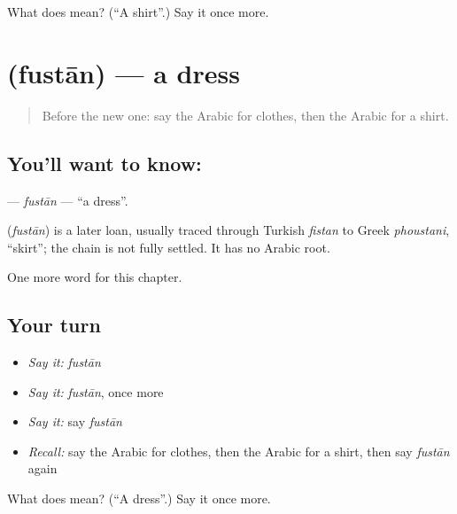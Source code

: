 \begin{tcolorbox}[breakable,colback=teal!4,colframe=teal!35!black,title={Before you move on}]
What does  mean? (\textquotedblleft{}A shirt\textquotedblright{}.) Say it once more.
\end{tcolorbox}
\section[\texorpdfstring{\ar{فستان} (fustān)}{فستان (fustān)}]{ (fustān) — a dress}

\label{lesson:AR-C94-fustan}



\begin{quote}
Before the new one: say the Arabic for clothes, then the Arabic for a shirt.
\end{quote}

\subsection*{You'll want to know: }
\textbf{} — \emph{fustān} — \textquotedblleft{}a dress\textquotedblright{}.

\begin{cousinweb}
\textbf{} (\emph{fustān}) is a later loan, usually traced through Turkish \emph{fistan} to Greek \emph{phoustani}, \textquotedblleft{}skirt\textquotedblright{}; the chain is not fully settled. It has no Arabic root.
\end{cousinweb}

\begin{grammarlens}[title={What you've built}]
One more word for this chapter.
\end{grammarlens}

\subsection*{Your turn}
\begin{itemize}
\raggedright
  \item \emph{Say it:} \emph{fustān}
  \item \emph{Say it:} \emph{fustān}, once more
  \item \emph{Say it:} say \emph{fustān}
  \item \emph{Recall:} say the Arabic for clothes, then the Arabic for a shirt, then say \emph{fustān} again
\end{itemize}

\begin{tcolorbox}[breakable,colback=teal!4,colframe=teal!35!black,title={Before you move on}]
What does  mean? (\textquotedblleft{}A dress\textquotedblright{}.) Say it once more.
\end{tcolorbox}

